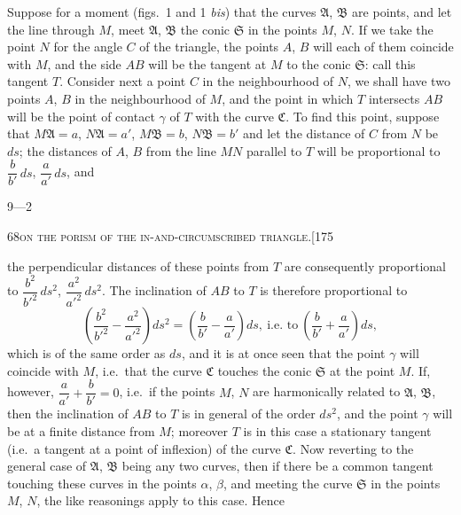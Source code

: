 \documentclass[11pt]{article}
\begin{document}
Suppose for a moment (figs.~1 and 1 \emph{bis}) that the curves $\mathfrak{A}$, $\mathfrak{B}$ are points, and let
the line through $M$, meet $\mathfrak{A}$, $\mathfrak{B}$ the conic $\mathfrak{S}$ in the points $M$, $N$. If we take the point
$N$ for the angle $C$ of the triangle, the points $A$, $B$ will each of them coincide with
$M$, and the side $AB$ will be the tangent at $M$ to the conic $\mathfrak{S}$: call this tangent $T$.
Consider next a point $C$ in the neighbourhood of $N$, we shall have two points $A$, $B$
in the neighbourhood of $M$, and the point in which $T$ intersects $AB$ will be the
point of contact $\gamma$ of $T$ with the curve $\mathfrak{C}$. To find this point, suppose that $M\mathfrak{A} = a$,
$N\mathfrak{A} = a'$, $M\mathfrak{B} = b$, $N\mathfrak{B} = b'$ and let the distance of $C$ from $N$ be $ds$; the distances
of $A$, $B$ from the line $MN$ parallel to $T$ will be proportional to $\dfrac{b}{b'}\,ds$, $\dfrac{a}{a'}\,ds$, and

\medskip
\hfill 9---2

\newpage

\begin{center}
\small\textsc{68}\hfill\textsc{on the porism of the in-and-circumscribed triangle.}\hfill[175
\end{center}

\medskip

\noindent the perpendicular distances of these points from $T$ are consequently proportional to
$\dfrac{b^{2}}{b'^{2}}\,ds^{2}$, $\dfrac{a^{2}}{a'^{2}}\,ds^{2}$. The inclination of $AB$ to $T$ is therefore proportional to
\[
\left(\frac{b^{2}}{b'^{2}} - \frac{a^{2}}{a'^{2}}\right)ds^{2} = \left(\frac{b}{b'} - \frac{a}{a'}\right)ds,\ \text{i.e.\ to}\ \left(\frac{b}{b'} + \frac{a}{a'}\right)ds,
\]
which is of the same order as $ds$, and it is at once seen that the point $\gamma$ will
coincide with $M$, i.e.\ that the curve $\mathfrak{C}$ touches the conic $\mathfrak{S}$ at the point $M$. If,
however, $\dfrac{a}{a'} + \dfrac{b}{b'} = 0$, i.e.\ if the points $M$, $N$ are harmonically related to $\mathfrak{A}$, $\mathfrak{B}$, then the
inclination of $AB$ to $T$ is in general of the order $ds^{2}$, and the point $\gamma$ will be at a finite distance
from $M$; moreover $T$ is in this case a stationary tangent (i.e.\ a tangent at a point
of inflexion) of the curve $\mathfrak{C}$. Now reverting to the general case of $\mathfrak{A}$, $\mathfrak{B}$ being any
two curves, then if there be a common tangent touching these curves in the points
$\alpha$, $\beta$, and meeting the curve $\mathfrak{S}$ in the points $M$, $N$, the like reasonings apply to this
case. Hence
\end{document}
